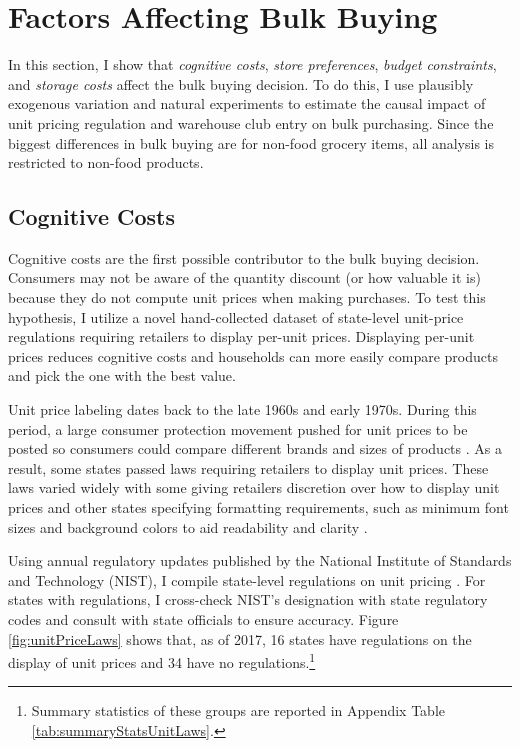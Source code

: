 \documentclass[AER]{AEA_mal}
\begin{document}
\section{Factors Affecting Bulk Buying}
\label{factors}

In this section, I show that \textit{cognitive costs}, \textit{store preferences}, \textit{budget constraints}, and \textit{storage costs} affect the bulk buying decision. To do this, I use plausibly exogenous variation and natural experiments to estimate the causal impact of unit pricing regulation and warehouse club entry on bulk purchasing. Since the biggest differences in bulk buying are for non-food grocery items, all analysis is restricted to non-food products.

\subsection{Cognitive Costs}
\label{salience}

Cognitive costs are the first possible contributor to the bulk buying decision. Consumers may not be aware of the quantity discount (or how valuable it is) because they do not compute unit prices when making purchases. To test this hypothesis, I utilize a novel hand-collected dataset of state-level unit-price regulations requiring retailers to display per-unit prices. Displaying per-unit prices reduces cognitive costs and households can more easily compare products and pick the one with the best value.

Unit price labeling dates back to the late 1960s and early 1970s. During this period, a large consumer protection movement pushed for unit prices to be posted so consumers could compare different brands and sizes of products \citep{miyazaki2000}. As a result, some states passed laws requiring retailers to display unit prices. These laws varied widely with some giving retailers discretion over how to display unit prices and other states specifying formatting requirements, such as minimum font sizes and background colors to aid readability and clarity \citep{rose2000}.

Using annual regulatory updates published by the National Institute of Standards and Technology (NIST), I compile state-level regulations on unit pricing \citep{nist130}. For states with regulations, I cross-check NIST's designation with state regulatory codes and consult with state officials to ensure accuracy. Figure \ref{fig:unitPriceLaws} shows that, as of 2017, 16 states have regulations on the display of unit prices and 34 have no regulations.\footnote{Summary statistics of these groups are reported in Appendix Table \ref{tab:summaryStatsUnitLaws}.}
\end{document}
